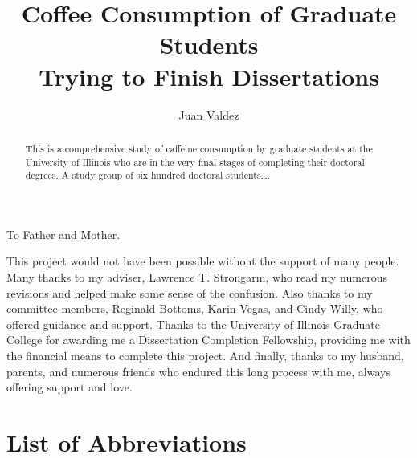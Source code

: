\documentclass{uiucthesis2021}
\begin{document}
\title{Coffee Consumption of Graduate Students \\
       Trying to Finish Dissertations}
\author{Juan Valdez}
\phdthesis
{}
\maketitle

\frontmatter

\begin{abstract}
This is a comprehensive study of caffeine consumption by graduate
students at the University of Illinois who are in the very final
stages of completing their doctoral degrees. A study group of six
hundred doctoral students\ldots.
\end{abstract}

\begin{dedication}
To Father and Mother.
\end{dedication}

\begin{acknowledgments}
This project would not have been possible without the support of
many people. Many thanks to my adviser, Lawrence T. Strongarm, who
read my numerous revisions and helped make some sense of the
confusion. Also thanks to my committee members, Reginald Bottoms,
Karin Vegas, and Cindy Willy, who offered guidance and support.
Thanks to the University of Illinois Graduate College for awarding
me a Dissertation Completion Fellowship, providing me with the
financial means to complete this project. And finally, thanks to
my husband, parents, and numerous friends who endured this long
process with me, always offering support and love.
\end{acknowledgments}

{
    \hypersetup{linkcolor=black}  %
    \tableofcontents
}

\chapter{List of Abbreviations}
\end{document}
